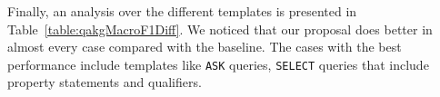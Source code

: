 \newpage

Finally, an analysis over the different \LCQuADtwo{} templates is presented in Table~\ref{table:qakgMacroF1Diff}. 
We noticed that our proposal does better in almost every case compared with the baseline. The 
cases with the best performance include templates like \texttt{ASK} queries, \texttt{SELECT} 
queries that include property statements and qualifiers. 

\begin{table}[h!]
    \centering
\end{table}
